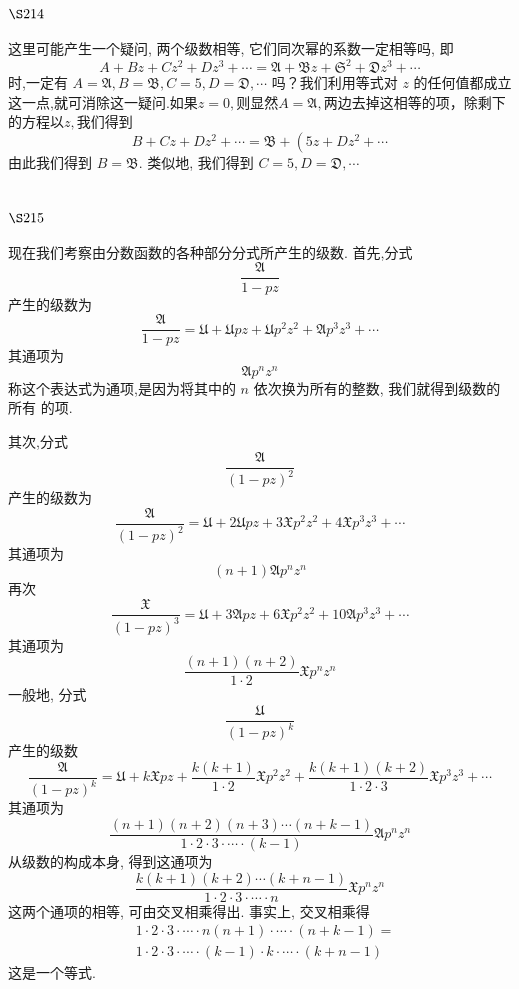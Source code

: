 \section{$\S 214$}

这里可能产生一个疑问, 两个级数相等, 它们同次幂的系数一定相等吗, 即
\[
A+B z+C z^{2}+D z^{3}+\cdots=\mathfrak{A}+\mathfrak{B} z+\mathfrak{S}^{2}+\mathfrak{D} z^{3}+\cdots
\]
时,一定有 $A=\mathfrak{A}, B=\mathfrak{B}, C=\mathfrak{5}, D=\mathfrak{D}, \cdots$ 吗？我们利用等式对 $z$ 的任何值都成立这一点,就可消除这一疑问.如果$z=0,$则显然$A=\mathfrak{A},$两边去掉这相等的项，除剩下的方程以$z,$我们得到
\[
B+C z+D z^{2}+\cdots=\mathfrak{B}+\left(5 z+D z^{2}+\cdots\right.
\]
由此我们得到 $B=\mathfrak{B}$. 类似地, 我们得到 $C=\mathfrak{5}, D=\mathfrak{D}, \cdots$

\section{$\S 215$}

现在我们考察由分数函数的各种部分分式所产生的级数. 首先,分式
\[
\frac{\mathfrak{A}}{1-p z}
\]
产生的级数为
\[
\frac{\mathfrak{A}}{1-p z}=\mathfrak{U}+\mathfrak{U} p z+\mathfrak{U} p^{2} z^{2}+\mathfrak{A} p^{3} z^{3}+\cdots
\]
其通项为
\[
\mathfrak{A} p^{n} z^{n}
\]
称这个表达式为通项,是因为将其中的 $n$ 依次换为所有的整数, 我们就得到级数的所有 的项.

其次,分式
\[
\frac{\mathfrak{A}}{(1-p z)^{2}}
\]
产生的级数为
\[
\frac{\mathfrak{A}}{(1-p z)^{2}}=\mathfrak{U}+2 \mathfrak{U} p z+3 \mathfrak{X} p^{2} z^{2}+4 \mathfrak{X} p^{3} z^{3}+\cdots
\]
其通项为
\[
(n+1) \mathfrak{A} p^{n} z^{n}
\]
再次
\[
\frac{\mathfrak{X}}{(1-p z)^{3}}=\mathfrak{U}+3 \mathfrak{A} p z+6 \mathfrak{X} p^{2} z^{2}+10 \mathfrak{A} p^{3} z^{3}+\cdots
\]
其通项为
\[
\frac{(n+1)(n+2)}{1 \cdot 2} \mathfrak{X} p^{n} z^{n}
\]
一般地, 分式
\[
\frac{\mathfrak{U}}{(1-p z)^{k}}
\]
产生的级数
\[
\frac{\mathfrak{A}}{(1-p z)^{k}}=\mathfrak{U}+k \mathfrak{X} p z+\frac{k(k+1)}{1 \cdot 2} \mathfrak{X} p^{2} z^{2}+\frac{k(k+1)(k+2)}{1 \cdot 2 \cdot 3} \mathfrak{X} p^{3} z^{3}+\cdots
\]
其通项为
\[
\frac{(n+1)(n+2)(n+3) \cdots(n+k-1)}{1 \cdot 2 \cdot 3 \cdot \cdots \cdot(k-1)} \mathfrak{A} p^{n} z^{n}
\]
从级数的构成本身, 得到这通项为
\[
\frac{k(k+1)(k+2) \cdots(k+n-1)}{1 \cdot 2 \cdot 3 \cdot \cdots \cdot n} \mathfrak{X} p^{n} z^{n}
\]
这两个通项的相等, 可由交叉相乘得出. 事实上, 交叉相乘得
\[
\begin{aligned}
& 1 \cdot 2 \cdot 3 \cdot \cdots \cdot n(n+1) \cdot \cdots \cdot(n+k-1)= \\
& 1 \cdot 2 \cdot 3 \cdot \cdots \cdot(k-1) \cdot k \cdot \cdots \cdot(k+n-1)
\end{aligned}
\]
这是一个等式.

